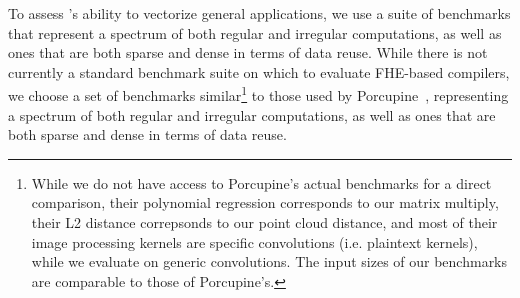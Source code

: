 To assess \system's ability to vectorize general applications, we use a suite of benchmarks that represent a spectrum of both regular and irregular computations, as well as ones that are both sparse and dense in terms of data reuse.
While there is not currently a standard benchmark suite on which to evaluate FHE-based compilers, we choose a set of benchmarks similar\footnote{While we do not have access to Porcupine's actual benchmarks for a direct comparison, their polynomial regression corresponds to our matrix multiply, their L2 distance correpsonds to our point cloud distance, and most of their image processing kernels are specific convolutions (i.e. plaintext kernels), while we evaluate on generic convolutions. The input sizes of our benchmarks are comparable to those of Porcupine's.} to those used by Porcupine~\cite{Porcupine}, representing a spectrum of both regular and irregular computations, as well as ones that are both sparse and dense in terms of data reuse.


